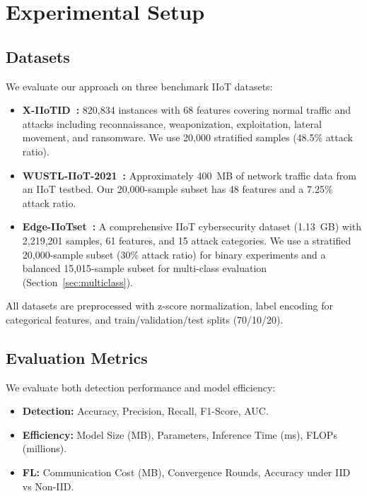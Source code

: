 \documentclass[a4paper,fleqn]{cas-sc}
\begin{document}
\section{Experimental Setup}
\label{sec:setup}

\subsection{Datasets}
\label{sec:datasets}

We evaluate our approach on three benchmark IIoT datasets:
\begin{itemize}
    \item \textbf{X-IIoTID~\cite{alhawawreh2021xiitoid}:} 820,834 instances with 68 features covering normal traffic and attacks including reconnaissance, weaponization, exploitation, lateral movement, and ransomware. We use 20,000 stratified samples (48.5\% attack ratio).
    \item \textbf{WUSTL-IIoT-2021~\cite{zolanvari2021wustl}:} Approximately 400~MB of network traffic data from an IIoT testbed. Our 20,000-sample subset has 48 features and a 7.25\% attack ratio.
    \item \textbf{Edge-IIoTset~\cite{ferrag2022edgeiiotset}:} A comprehensive IIoT cybersecurity dataset (1.13~GB) with 2,219,201 samples, 61 features, and 15 attack categories. We use a stratified 20,000-sample subset (30\% attack ratio) for binary experiments and a balanced 15,015-sample subset for multi-class evaluation (Section~\ref{sec:multiclass}).
\end{itemize}
All datasets are preprocessed with z-score normalization, label encoding for categorical features, and train/validation/test splits (70/10/20).

\subsection{Evaluation Metrics}
\label{sec:metrics}

We evaluate both detection performance and model efficiency:
\begin{itemize}
    \item \textbf{Detection:} Accuracy, Precision, Recall, F1-Score, AUC.
    \item \textbf{Efficiency:} Model Size (MB), Parameters, Inference Time (ms), FLOPs (millions).
    \item \textbf{FL:} Communication Cost (MB), Convergence Rounds, Accuracy under IID vs Non-IID.
\end{itemize}
\end{document}
